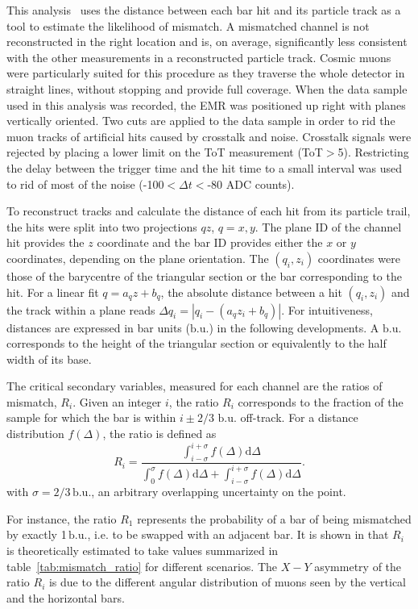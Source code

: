 \documentclass[a4paper,11pt]{article}
\begin{document}
This analysis~\cite{emr_xt, Francois} 
uses the distance between each bar hit and its particle track as a tool to estimate the likelihood of mismatch. A mismatched channel is
not reconstructed in the right location and is, on average, significantly less consistent with the other measurements in a reconstructed particle track.
Cosmic muons were particularly suited for this procedure as they traverse the whole detector in straight lines, without stopping and provide full coverage.
When the data sample used in this analysis was recorded, the EMR was positioned up right with planes vertically oriented. Two cuts are applied to the data
sample in order to rid the muon tracks of artificial hits caused by crosstalk and noise. Crosstalk signals were rejected by placing a lower limit on the
ToT measurement (ToT$>$5). Restricting the delay between the trigger time and the hit time to a small interval was used to rid of most of the noise
(-100$<\Delta t<$-80 ADC counts). 

To reconstruct tracks and calculate
the distance of each hit from its particle trail, the hits were
split into two projections $qz$, $q=x,y$. The plane ID of the channel hit provides the $z$ coordinate and the bar ID provides either the $x$ or $y$ coordinates,
depending on the plane orientation. The $(q_i,z_i)$ coordinates were those of the barycentre of the triangular section or the bar corresponding to the hit. For
a linear fit $q=a_qz+b_q$, the absolute distance between a hit $(q_i,z_i)$ and the track within a plane reads $\Delta q_i=|q_i-(a_qz_i+b_q)|$. For intuitiveness,
distances are expressed in bar units ($\mathrm{b.u.}$) in the following developments. A $\mathrm{b.u.}$ corresponds to the height of the triangular section or
equivalently to the half width of its base.

The critical secondary variables, measured for each channel are the ratios of mismatch, $R_i$. Given an integer $i$, the ratio $R_i$ corresponds to the fraction
of the sample for which the bar is within $i\pm2/3$ $\mathrm{b.u.}$ off-track. For a distance distribution $f(\Delta)$, the ratio is defined as
\begin{equation}
R_i=\frac{\int_{i-\sigma}^{i+\sigma}f(\Delta)\mathrm{d}\Delta}{\int_{0}^{\sigma}f(\Delta)\mathrm{d}\Delta+\int_{i-\sigma}^{i+\sigma}f(\Delta)\mathrm{d}\Delta}.
\end{equation}
with $\sigma=2/3\,\mathrm{b.u.}$, an arbitrary overlapping uncertainty on the point.

For instance, the ratio $R_1$ represents the probability of a bar of being mismatched by exactly 1\,$\mathrm{b.u.}$, i.e. to be swapped with an adjacent bar.
It is shown in \cite{Francois} that $R_i$ is theoretically estimated to take values summarized in table~\ref{tab:mismatch_ratio} for different scenarios.
The $X-Y$ asymmetry of the ratio $R_i$ is due to the different angular distribution of muons seen by the vertical and the horizontal bars.
\end{document}

